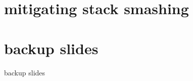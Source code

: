 \graphicspath{{./figures/}}
\date{}

\begin{frame}
    \titlepage
\end{frame}



\usetikzlibrary{arrows.meta,calc,matrix,positioning}
\section{mitigating stack smashing}













\section{backup slides}
\begin{frame}{backup slides}
\end{frame}





